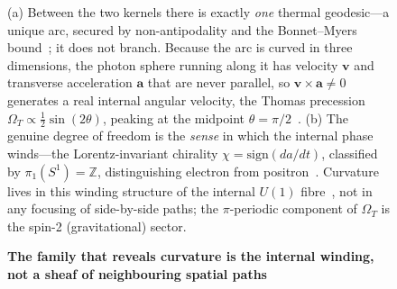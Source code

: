 \documentclass[%
 reprint, amsmath,amssymb, aps, prb, ]{revtex4-2}
\numberwithin{equation}{section}
\begin{document}
\begin{figure}[t!]
\centering
{}
\caption{\textbf{The family that reveals curvature is the internal winding, not a sheaf of neighbouring spatial paths}}
\label{fig:vortex}
\vspace{0.4em}
\begin{minipage}{0.95\textwidth}
\justifying\small
(a) Between the two kernels there is exactly \emph{one} thermal geodesic---a unique arc, secured by non-antipodality and the Bonnet--Myers bound~\cite{hanamura51}; it does not branch. Because the arc is curved in three dimensions, the photon sphere running along it has velocity $\mathbf v$ and transverse acceleration $\mathbf a$ that are never parallel, so $\mathbf v\times\mathbf a\neq 0$ generates a real internal angular velocity, the Thomas precession $\Omega_T\propto\tfrac12\sin(2\theta)$, peaking at the midpoint $\theta=\pi/2$~\cite{hanamura19,hanamura49}. (b) The genuine degree of freedom is the \emph{sense} in which the internal phase winds---the Lorentz-invariant chirality $\chi=\mathrm{sign}(da/dt)$, classified by $\pi_1(S^1)=\mathbb{Z}$, distinguishing electron from positron~\cite{hanamura50}. Curvature lives in this winding structure of the internal $U(1)$ fibre~\cite{hanamura48}, not in any focusing of side-by-side paths; the $\pi$-periodic component of $\Omega_T$ is the spin-2 (gravitational) sector.
\end{minipage}
\end{figure}
\end{document}
